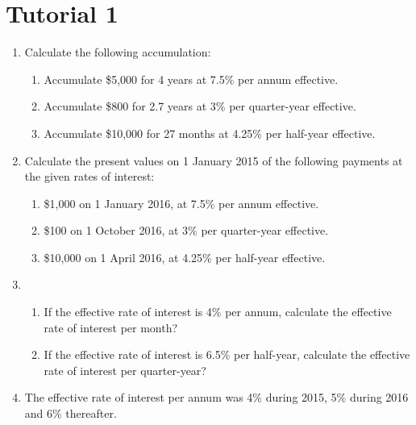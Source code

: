 \documentclass[
]{article}
\theoremstyle{definition}
\theoremstyle{definition}
\theoremstyle{definition}
\theoremstyle{definition}
\theoremstyle{remark}
\begin{document}
\hypertarget{tutorial-1}{%
\section{Tutorial 1}\label{tutorial-1}}

\begin{enumerate}
\def\labelenumi{\arabic{enumi}.}
\item
  Calculate the following accumulation:

  \begin{enumerate}
  \def\labelenumii{\arabic{enumii}.}
  \item
    Accumulate \$5,000 for 4 years at 7.5\% per annum effective.
  \item
    Accumulate \$800 for 2.7 years at 3\% per quarter-year effective.
  \item
    Accumulate \$10,000 for 27 months at 4.25\% per half-year
    effective.
  \end{enumerate}
\item
  Calculate the present values on 1 January 2015 of the following
  payments at the given rates of interest:

  \begin{enumerate}
  \def\labelenumii{\arabic{enumii}.}
  \item
    \$1,000 on 1 January 2016, at 7.5\% per annum effective.
  \item
    \$100 on 1 October 2016, at 3\% per quarter-year effective.
  \item
    \$10,000 on 1 April 2016, at 4.25\% per half-year effective.
  \end{enumerate}
\item
  \begin{enumerate}
  \def\labelenumii{\arabic{enumii}.}
  \item
    If the effective rate of interest is 4\% per annum, calculate the
    effective rate of interest per month?
  \item
    If the effective rate of interest is 6.5\% per half-year,
    calculate the effective rate of interest per quarter-year?
  \end{enumerate}
\item
  The effective rate of interest per annum was 4\% during 2015, 5\%
  during 2016 and 6\% thereafter.


\end{enumerate}
\end{document}
